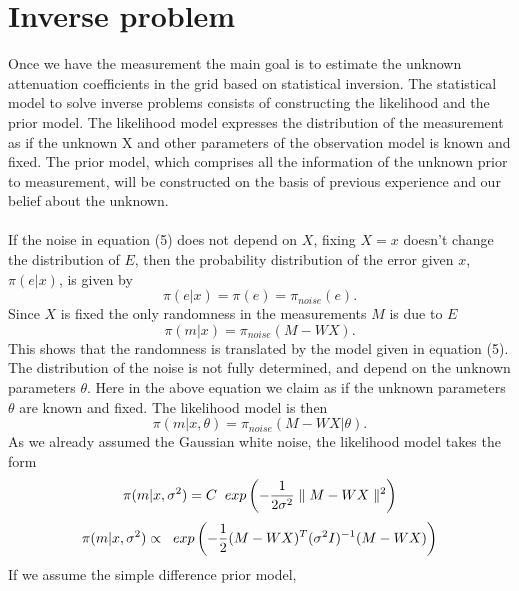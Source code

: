 \documentclass[12pt,A4]{article}
\begin{document}
\section{Inverse problem}
Once we have the measurement the main goal is to estimate the unknown attenuation coefficients in the grid based on statistical inversion. The statistical model to solve inverse problems consists of constructing the likelihood and the prior model. The likelihood model expresses the distribution of the measurement as if the unknown X and other parameters of the observation model is known and fixed. The prior model, which comprises all the information of the unknown prior to measurement, will be constructed on the basis of previous experience and our belief about the unknown.\\\\
If the noise in equation (5) does not depend on $X$, fixing $X=x$ doesn't change the distribution of $E$, then the probability distribution of the error given $x$, $\pi(e|x)$, is given by
\begin{equation}
\pi(e|x)=\pi(e)=\pi_{noise}(e).
\end{equation}
Since $X$ is fixed the only randomness in the measurements $M$ is due to $E$
\begin{equation}
\pi(m|x)=\pi_{noise}(M-WX).
\end{equation}
This shows that the randomness is translated by the model given in equation (5). 
The distribution of the noise is not fully determined, and depend on the unknown parameters $\theta$. Here in the above equation we claim as if the unknown parameters $\theta$ are known and fixed. The likelihood model is then
\begin{equation}
\pi(m|x,\theta)=\pi_{noise}(M-WX|\theta).
\end{equation}
As we already assumed the Gaussian white noise, the likelihood model takes the form
\begin{equation*}
\pi(m|x,\sigma^2)=C\hspace{0.2cm}exp\left(-\frac{1}{2\sigma^2}\parallel M-WX\parallel ^2\right)
\end{equation*}
\begin{equation}
\pi(m|x,\sigma^2)\propto\hspace{0.2cm}exp\left(-\frac{1}{2}( M-WX)^{T}(\sigma^2 I)^{-1} (M-WX)\right)
\end{equation}
If we assume the simple difference prior model, 
\end{document}
